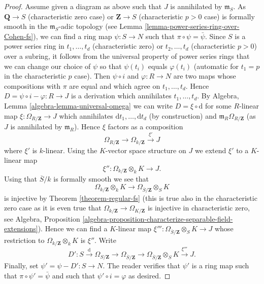 \begin{proof}
\medskip\noindent
Assume given a diagram as above such that $J$ is annihilated by
$\mathfrak m_S$. As $\mathbf{Q} \to S$ (characteristic zero case)
or $\mathbf{Z} \to S$ (characteristic $p > 0$ case)
is formally smooth in the $\mathfrak m_S$-adic topology (see
Lemma \ref{lemma-power-series-ring-over-Cohen-fs}), we can find
a ring map $\psi : S \to N$ such that $\pi \circ \psi = \bar \psi$.
Since $S$ is a power series ring in $t_1, \ldots, t_d$ (characteristic zero)
or $t_2, \ldots, t_d$ (characteristic $p > 0$) over
a subring, it follows from the universal property of power series rings
that we can change our choice of $\psi$ so that $\psi(t_i)$ equals
$\varphi(t_i)$ (automatic for $t_1 = p$ in the characteristic $p$ case).
Then $\psi \circ i$ and $\varphi : R \to N$ are two maps whose
compositions with $\pi$ are equal and which agree on $t_1, \ldots, t_d$.
Hence $D = \psi \circ i - \varphi : R \to J$ is a derivation which
annihilates $t_1, \ldots, t_d$.
By Algebra, Lemma \ref{algebra-lemma-universal-omega} we can write
$D = \xi \circ \text{d}$ for some $R$-linear map
$\xi : \Omega_{R/\mathbf{Z}} \to J$ which annihilates
$\text{d}t_1, \ldots, \text{d}t_d$ (by construction) and
$\mathfrak m_R \Omega_{R/\mathbf{Z}}$ (as $J$ is annihilated by
$\mathfrak m_R$). Hence $\xi$ factors as a composition
$$
\Omega_{R/\mathbf{Z}} \to \Omega_{k/\mathbf{Z}} \xrightarrow{\xi'} J
$$
where $\xi'$ is $k$-linear. Using the $K$-vector space structure on $J$ we
extend $\xi'$ to a $K$-linear map
$$
\xi'' : \Omega_{k/\mathbf{Z}} \otimes_k K \longrightarrow J.
$$
Using that $\overline{S}/k$ is formally smooth we see that
$$
\Omega_{k/\mathbf{Z}} \otimes_k K \to
\Omega_{\overline{S}/\mathbf{Z}} \otimes_S K
$$
is injective by Theorem \ref{theorem-regular-fs} (this is true also
in the characteristic zero case as it is even true that
$\Omega_{k/\mathbf{Z}} \to \Omega_{K/\mathbf{Z}}$ is injective
in characteristic zero, see Algebra,
Proposition \ref{algebra-proposition-characterize-separable-field-extensions}).
Hence we can find a $K$-linear map
$\xi''' : \Omega_{\overline{S}/\mathbf{Z}} \otimes_S K \to J$ whose
restriction to $\Omega_{k/\mathbf{Z}} \otimes_k K$ is $\xi''$. Write
$$
D' : S \xrightarrow{\text{d}} \Omega_{S/\mathbf{Z}}
\to \Omega_{\overline{S}/\mathbf{Z}} \to
\Omega_{\overline{S}/\mathbf{Z}} \otimes_S K \xrightarrow{\xi'''} J.
$$
Finally, set $\psi' = \psi - D' : S \to N$. The reader verifies that $\psi'$
is a ring map such that $\pi \circ \psi' = \bar \psi$ and such that
$\psi' \circ i = \varphi$ as desired.
\end{proof}

